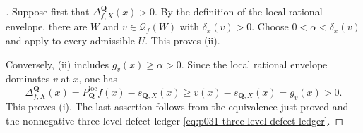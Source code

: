 \begin{proof}[]
Suppose first that $\Delta^{\mathbf Q}_{f,X}(x)>0$.  By the definition of
the local rational envelope, there are $W$ and $v\in\mathcal Q_f(W)$ with
$\delta_x(v)>0$.  Choose $0<\alpha<\delta_x(v)$ and apply
 to every admissible $U$.  This proves
\textup{(ii)}.

Conversely, \textup{(ii)} includes $g_v(x)\geq\alpha>0$.  Since the local
rational envelope dominates $v$ at $x$, one has
\[
 \Delta^{\mathbf Q}_{f,X}(x)
   =P_{\mathbf Q}^{\mathrm{loc}}f(x)-s_{\mathbf Q,X}(x)
   \geq v(x)-s_{\mathbf Q,X}(x)
   =g_v(x)>0.
\]
This proves \textup{(i)}.  The last assertion follows from the equivalence
just proved and the nonnegative three-level defect ledger
\eqref{eq:p031-three-level-defect-ledger}.
\end{proof}
